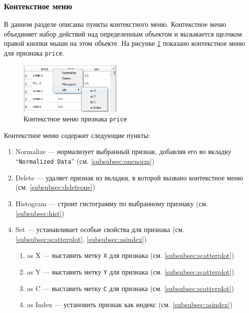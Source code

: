 \documentclass[12pt,twoside,a4paper,tikz,border=5]{refart}
\begin{document}
\subsubsection{Контекстное меню}
В данном разделе описаны пункты контекстного меню. Контекстное меню объединяет набор действий над определенным объектом и вызывается щелчком правой кнопки мыши на этом объекте. На рисунке \ref{fig:contextmenu} показано контекстное меню для признака \texttt{price}.

\begin{figure}[t!]
	\centering
	\includegraphics[width=0.45\textwidth]{img/contextmenufeature}
	\caption{Контекстное меню признака \texttt{price}}
	\label{fig:contextmenu}
\end{figure}

\newpage
Контекстное меню содержит следующие пункты:
\begin{enumerate}
	\item Normalize --- нормализует выбранный признак, добавляя его во вкладку 	``\texttt{Normalized Data}'' (см. \ref{subsubsec:onenorm})
	\item Delete --- удаляет признак из вкладки, в которой вызвано контекстное меню (см. \ref{subsubsec:deleteone})
	\item Histogram --- строит гистограмму по выбранному признаку (см. \ref{subsubsec:hist})
	\item Set --- устанавливает особые свойства для признака (см. \ref{subsubsec:scatterplot}, \ref{subsubsec:asindex})
	\begin{enumerate}
		\item as X --- выставить метку \texttt{X} для признака (см. \ref{subsubsec:scatterplot})
		\item as Y --- выставить метку \texttt{Y} для признака (см. \ref{subsubsec:scatterplot})
		\item as C --- выставить метку \texttt{C} для признака (см. \ref{subsubsec:scatterplot})
		\item as Index --- установить признак как индекс (см. \ref{subsubsec:asindex})
	\end{enumerate}
\end{enumerate}
\end{document}
